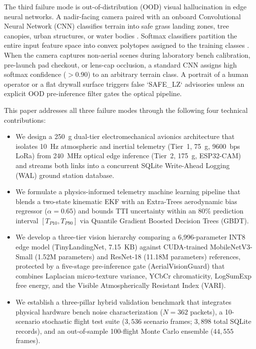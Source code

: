 \documentclass[conference]{IEEEtran}
\begin{document}
The third failure mode is out-of-distribution (OOD) visual hallucination in edge neural networks. A nadir-facing camera paired with an onboard Convolutional Neural Network (CNN) classifies terrain into safe grass landing zones, tree canopies, urban structures, or water bodies \cite{eurosat_helber}. Softmax classifiers partition the entire input feature space into convex polytopes assigned to the training classes \cite{energy_ood_liu}. When the camera captures non-aerial scenes during laboratory bench calibration, pre-launch pad checkout, or lens-cap occlusion, a standard CNN assigns high softmax confidence ($>0.90$) to an arbitrary terrain class. A portrait of a human operator or a flat drywall surface triggers false `SAFE_LZ` advisories unless an explicit OOD pre-inference filter gates the optical pipeline.

This paper addresses all three failure modes through the following four technical contributions:
\begin{itemize}
\item We design a 250~g dual-tier electromechanical avionics architecture that isolates 10~Hz atmospheric and inertial telemetry (Tier~1, 75~g, 9600~bps LoRa) from 240~MHz optical edge inference (Tier~2, 175~g, ESP32-CAM) and streams both links into a concurrent SQLite Write-Ahead Logging (WAL) ground station database.
\item We formulate a physics-informed telemetry machine learning pipeline that blends a two-state kinematic EKF with an Extra-Trees aerodynamic bias regressor ($\alpha = 0.65$) and bounds TTI uncertainty within an 80\% prediction interval $[T_{P10}, T_{P90}]$ via Quantile Gradient Boosted Decision Trees (GBDT).
\item We develop a three-tier vision hierarchy comparing a 6,996-parameter INT8 edge model (TinyLandingNet, 7.15~KB) against CUDA-trained MobileNetV3-Small (1.52M parameters) and ResNet-18 (11.18M parameters) references, protected by a five-stage pre-inference gate (AerialVisionGuard) that combines Laplacian micro-texture variance, YCbCr chromaticity, LogSumExp free energy, and the Visible Atmospherically Resistant Index (VARI).
\item We establish a three-pillar hybrid validation benchmark that integrates physical hardware bench noise characterization ($N = 362$ packets), a 10-scenario stochastic flight test suite ($3,536$ scenario frames; $3,898$ total SQLite records), and an out-of-sample 100-flight Monte Carlo ensemble ($44,555$ frames).
\end{itemize}
\end{document}
